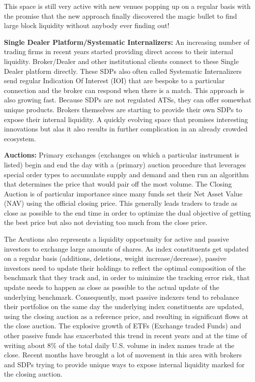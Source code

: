 This space is still very active with new venues popping up on a regular basis with the promise that the new approach finally discovered the magic bullet to find large block liquidity without anybody ever finding out! \twomedskip

\noindent\textbf{Single Dealer Platform/Systematic Internalizers:} An increasing number of trading firms in recent years started providing direct access to their internal liquidity. Broker/Dealer and other institutional clients connect to these Single Dealer platform directly. These SDPs also often called Systematic Internalizers send regular Indication Of Interest (IOI)  that are bespoke to a particular connection and the broker can respond when there is a match. This approach is also growing fast. Because SDPs are not regulated ATSs, they can offer somewhat unique products. Brokers themselves are starting to provide their own SDPs to expose their internal liquidity. A quickly evolving space that promises interesting innovations but alas it also results in further complication in an already crowded ecosystem. \twomedskip

\noindent\textbf{Auctions:} Primary exchanges (exchanges on which a particular instrument is listed) begin and end the day with a (primary) auction procedure that leverages special order types to accumulate supply and demand and then run an algorithm that determines the price that would pair off the most volume. The Closing Auction is of particular importance since many funds set their Net Asset Value (NAV) using the official closing price. This generally leads traders to trade as close as possible to the end time in order to optimize the dual objective of getting the best price but also not deviating too much from the close price. 

The Acutions also represents a liquidity opportunity for active and passive investors to exchange large amounts of shares. As index constituents get updated on a regular basis (additions, deletions, weight increase/decrease), passive investors need to update their holdings to reflect the optimal composition of the benchmark that they track and, in order to minimize the tracking error risk, that update needs to happen as close as possible to the actual update of the underlying benchmark. Consequently, most passive indexers tend to rebalance their portfolios on the same day the underlying index constituents are updated, using the closing auction as a reference price, and resulting in significant flows at the close auction. The explosive growth of ETFs (Exchange traded Funds) and other passive funds has exacerbated this trend in recent years and at the time of writing about 8\% of the total daily U.S. volume in index names trade at the close. Recent months have brought a lot of movement in this area with brokers and SDPs trying to provide unique ways to expose internal liquidity marked for the closing auction. \twomedskip

